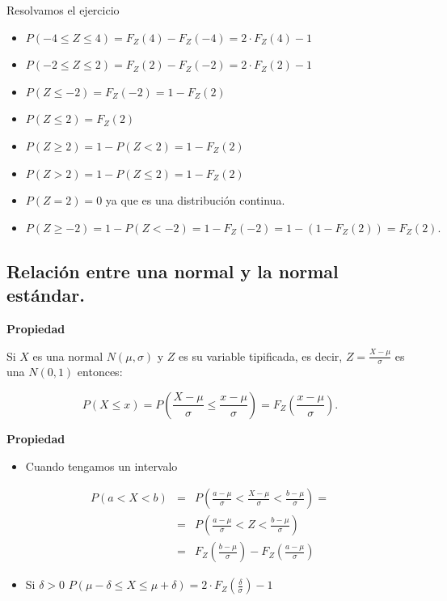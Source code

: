 \documentclass[]{book}
\providecommand{\tightlist}{%
  \setlength{\itemsep}{0pt}\setlength{\parskip}{0pt}}
\begin{document}
Resolvamos el ejercicio

\begin{itemize}
\tightlist
\item
  \(P(-4\leq Z \leq 4)=F_{Z}(4)-F_{Z}(-4)=2\cdot F_Z(4)-1\)
\item
  \(P(-2\leq Z \leq 2)=F_{Z}(2)-F_{Z}(-2)=2\cdot F_Z(2)-1\)
\item
  \(P(Z\leq -2)=F_Z(-2)=1-F_Z(2)\)
\item
  \(P( Z \leq 2)=F_{Z}(2)\)
\item
  \(P( Z \geq 2)=1-P(Z<2)=1-F_{Z}(2)\)
\item
  \(P( Z > 2)=1-P(Z\leq 2)=1-F_{Z}(2)\)
\item
  \(P( Z = 2)=0\) ya que es una distribución continua.
\item
  \(P( Z \geq -2)=1-P(Z< -2)=1-F_{Z}(-2)=1-(1-F_Z(2))=F_Z(2).\)
\end{itemize}

\hypertarget{relaciuxf3n-entre-una-normal-y-la-normal-estuxe1ndar.}{%
\subsection{Relación entre una normal y la normal estándar.}\label{relaciuxf3n-entre-una-normal-y-la-normal-estuxe1ndar.}}

\textbf{Propiedad}

Si \(X\) es una normal \(N(\mu,\sigma)\) y \(Z\) es su variable tipificada, es decir, \(Z=\frac{X-\mu}{\sigma}\) es una \(N(0,1)\) entonces:

\[
P(X\leq x)=P\left(\frac{X-\mu}{\sigma}\leq \frac{x-\mu}{\sigma}\right)=F_{Z}\left(\frac{x-\mu}{\sigma}\right).
\]

\textbf{Propiedad}

\begin{itemize}
\tightlist
\item
  Cuando tengamos un intervalo
\end{itemize}

\begin{eqnarray*}
P(a<X<b)&=&P\left(\frac{a-\mu}{\sigma}<\frac{X-\mu}{\sigma}<\frac{b-\mu}{\sigma}\right)= \\
&=& P\left(\frac{a-\mu}{\sigma}<Z<\frac{b-\mu}{\sigma}\right)\\
&=&F_{Z}\left(\frac{b-\mu}{\sigma}\right)-
F_{Z}\left(\frac{a-\mu}{\sigma}\right)
\end{eqnarray*}

\begin{itemize}
\tightlist
\item
  Si \(\delta>0\) \(P\left(\mu-\delta\leq X \leq\mu+\delta\right)=2\cdot F_Z\left(\frac{\delta}{\sigma}\right)-1\)
\end{itemize}
\end{document}
